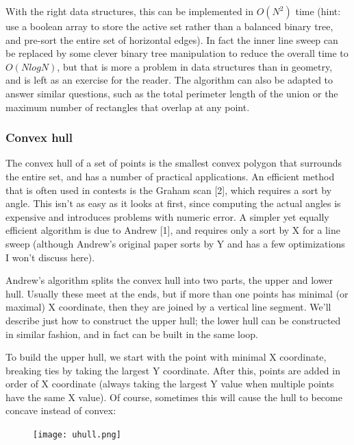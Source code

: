 \documentclass[a4paper,12pt]{article}
\begin{document}
With the right data structures, this can be implemented in $O(N^2)$ time (hint: use a boolean
array to store the active set rather than a balanced binary tree, and pre-sort the entire set
of horizontal edges). In fact the inner line sweep can be replaced by some clever binary 
tree manipulation to reduce the overall time to $O(N log N)$, but that is more a problem in 
data structures than in geometry, and is left as an exercise for the reader. The algorithm 
can also be adapted to answer similar questions, such as the total perimeter length of the 
union or the maximum number of rectangles that overlap at any point.

\subsubsection{Convex hull}

The convex hull of a set of points is the smallest convex polygon that surrounds the 
entire set, and has a number of practical applications. An efficient method that is often 
used in contests is the Graham scan [2], which requires a sort by angle. This isn't as easy 
as it looks at first, since computing the actual angles is expensive and introduces problems 
with numeric error. A simpler yet equally efficient algorithm is due to Andrew [1], and 
requires only a sort by X for a line sweep (although Andrew's original paper sorts by Y and 
has a few optimizations I won't discuss here).

Andrew's algorithm splits the convex hull into two parts, the upper and lower hull. Usually 
these meet at the ends, but if more than one points has minimal (or maximal) X coordinate, 
then they are joined by a vertical line segment. We'll describe just how to construct the 
upper hull; the lower hull can be constructed in similar fashion, and in fact can be built 
in the same loop.

To build the upper hull, we start with the point with minimal X coordinate, breaking ties by 
taking the largest Y coordinate. After this, points are added in order of X coordinate 
(always taking the largest Y value when multiple points have the same X value). Of course, 
sometimes this will cause the hull to become concave instead of convex:

\begin{figure}[ht]
  \centering
  \texttt{[image: uhull.png]}
\end{figure}
\end{document}

